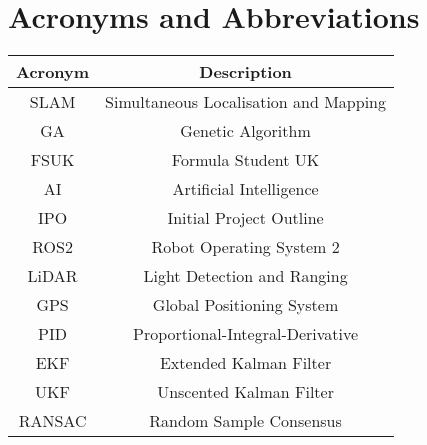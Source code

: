 \chapter{Acronyms and Abbreviations}\label{ch:acronyms-abbreviations}
\begin{center}
    \begin{tabular}{ |c|c| }
        \hline
        \textbf{Acronym} & \textbf{Description} \\
        \hline
        SLAM & Simultaneous Localisation and Mapping \\
        GA & Genetic Algorithm \\
        FSUK & Formula Student UK \\
        AI & Artificial Intelligence \\
        IPO & Initial Project Outline \\
        ROS2 & Robot Operating System 2 \\
        LiDAR & Light Detection and Ranging \\
        GPS & Global Positioning System \\
        PID & Proportional-Integral-Derivative \\
        EKF & Extended Kalman Filter \\
        UKF & Unscented Kalman Filter \\
        RANSAC & Random Sample Consensus \\
        \hline
    \end{tabular}
\end{center}